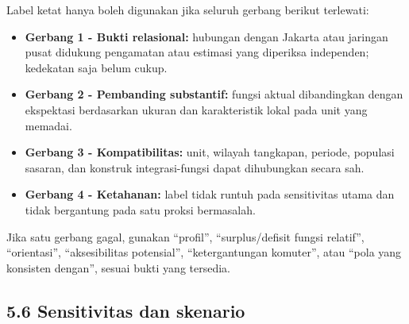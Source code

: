 \documentclass[
  indonesian,
  11pt,
]{article}
\providecommand{\tightlist}{%
  \setlength{\itemsep}{0pt}\setlength{\parskip}{0pt}}
\renewcommand{\tightlist}{%
  \setlength{\itemsep}{0.22em}%
  \setlength{\parskip}{0pt}%
}
\begin{document}
Label ketat hanya boleh digunakan jika seluruh gerbang berikut
terlewati:

\begin{itemize}
\tightlist
\item[$\square$]
  \textbf{Gerbang 1 - Bukti relasional:} hubungan dengan Jakarta atau
  jaringan pusat didukung pengamatan atau estimasi yang diperiksa
  independen; kedekatan saja belum cukup.
\item[$\square$]
  \textbf{Gerbang 2 - Pembanding substantif:} fungsi aktual dibandingkan
  dengan ekspektasi berdasarkan ukuran dan karakteristik lokal pada unit
  yang memadai.
\item[$\square$]
  \textbf{Gerbang 3 - Kompatibilitas:} unit, wilayah tangkapan, periode,
  populasi sasaran, dan konstruk integrasi-fungsi dapat dihubungkan
  secara sah.
\item[$\square$]
  \textbf{Gerbang 4 - Ketahanan:} label tidak runtuh pada sensitivitas
  utama dan tidak bergantung pada satu proksi bermasalah.
\end{itemize}

Jika satu gerbang gagal, gunakan ``profil'', ``surplus/defisit fungsi
relatif'', ``orientasi'', ``aksesibilitas potensial'', ``ketergantungan
komuter'', atau ``pola yang konsisten dengan'', sesuai bukti yang
tersedia.

\subsection{5.6 Sensitivitas dan
skenario}\label{sensitivitas-dan-skenario}
\end{document}
